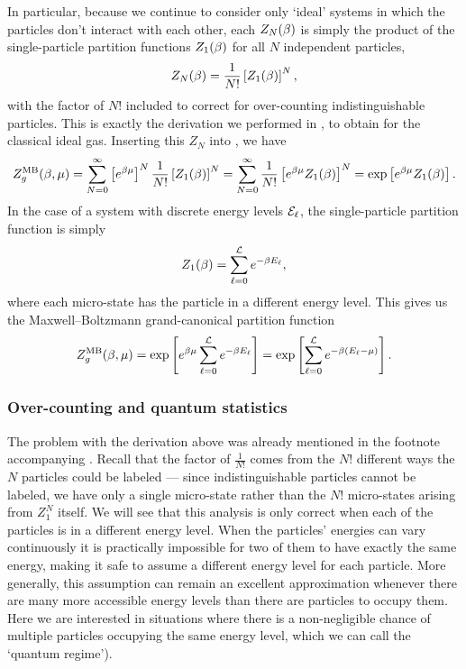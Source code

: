 In particular, because we continue to consider only `ideal' systems in which the particles don't interact with each other, each $Z_N(\beta)$ is simply the product of the single-particle partition functions $Z_1(\beta)$ for all $N$ independent particles,
\begin{equation*}
  Z_N(\beta) = \frac{1}{N!} \left[Z_1(\beta)\right]^N,
\end{equation*}
with the factor of $N!$ included to correct for over-counting indistinguishable particles.
This is exactly the derivation we performed in , to obtain  for the classical ideal gas.
Inserting this $Z_N$ into , we have
\begin{equation*}
  Z_g^{\text{MB}}(\beta, \mu) = \sum_{N = 0}^{\infty} \left[e^{\beta\mu}\right]^N \frac{1}{N!} \left[Z_1(\beta)\right]^N = \sum_{N = 0}^{\infty} \frac{1}{N!} \left[e^{\beta\mu} Z_1(\beta)\right]^N = \exp\left[e^{\beta\mu} Z_1(\beta)\right].
\end{equation*}
In the case of a system with discrete energy levels $\mathcal E_{\ell}$, the single-particle partition function is simply
\begin{equation*}
  Z_1(\beta) = \sum_{\ell = 0}^{\mathcal L} e^{-\beta E_{\ell}},
\end{equation*}
where each micro-state has the particle in a different energy level.
This gives us the Maxwell--Boltzmann grand-canonical partition function
\begin{equation}
  \label{eq:partfunc_MB_nonfactor}
  Z_g^{\text{MB}}(\beta, \mu) = \exp\left[e^{\beta\mu} \sum_{\ell = 0}^{\mathcal L} e^{-\beta E_{\ell}} \right] = \exp\left[\sum_{\ell = 0}^{\mathcal L} e^{-\beta\left(E_{\ell} - \mu\right)}\right].
\end{equation}



\subsubsection{Over-counting and quantum statistics}
The problem with the derivation above was already mentioned in the footnote accompanying .
Recall that the factor of $\frac{1}{N!}$ comes from the $N!$ different ways the $N$ particles could be labeled --- since indistinguishable particles cannot be labeled, we have only a single micro-state rather than the $N!$ micro-states arising from $Z_1^N$ itself.
We will see that this analysis is only correct when each of the particles is in a different energy level.
When the particles' energies can vary continuously it is practically impossible for two of them to have exactly the same energy, making it safe to assume a different energy level for each particle.
More generally, this assumption can remain an excellent approximation whenever there are many more accessible energy levels than there are particles to occupy them.
Here we are interested in situations where there is a non-negligible chance of multiple particles occupying the same energy level, which we can call the `quantum regime').

